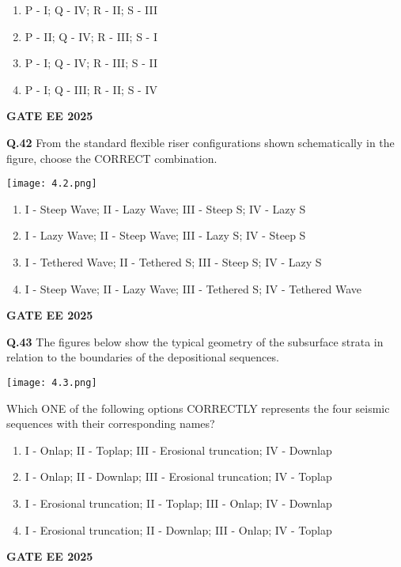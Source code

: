 \documentclass{article}
\begin{document}
\begin{enumerate}[label=(\Alph*)]
    \item P - I; Q - IV; R - II; S - III
    \item P - II; Q - IV; R - III; S - I
    \item P - I; Q - IV; R - III; S - II
    \item P - I; Q - III; R - II; S - IV
\end{enumerate}
\textbf{GATE EE 2025}

\vspace{0.5cm}

\textbf{Q.42} From the standard flexible riser configurations shown schematically in the figure, choose the CORRECT combination.

\texttt{[image: 4.2.png]}



\begin{enumerate}[label=(\Alph*)]
    \item I - Steep Wave; II - Lazy Wave; III - Steep S; IV - Lazy S
    \item I - Lazy Wave; II - Steep Wave; III - Lazy S; IV - Steep S
    \item I - Tethered Wave; II - Tethered S; III - Steep S; IV - Lazy S
    \item I - Steep Wave; II - Lazy Wave; III - Tethered S; IV - Tethered Wave
\end{enumerate}
\textbf{GATE EE 2025}

\vspace{0.5cm}

\textbf{Q.43} The figures below show the typical geometry of the subsurface strata in relation to the boundaries of the depositional sequences.

\texttt{[image: 4.3.png]}


Which ONE of the following options CORRECTLY represents the four seismic sequences with their corresponding names?

\begin{enumerate}[label=(\Alph*)]
    \item I - Onlap; II - Toplap; III - Erosional truncation; IV - Downlap
    \item I - Onlap; II - Downlap; III - Erosional truncation; IV - Toplap
    \item I - Erosional truncation; II - Toplap; III - Onlap; IV - Downlap
    \item I - Erosional truncation; II - Downlap; III - Onlap; IV - Toplap
\end{enumerate}
\textbf{GATE EE 2025}
\end{document}
